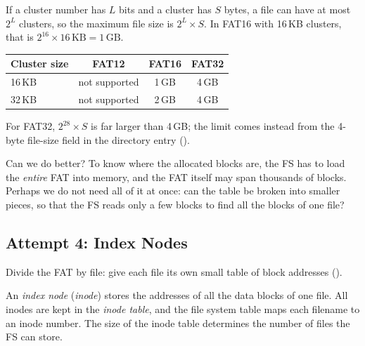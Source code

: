 \begin{keypoint}
  If a cluster number has $L$ bits and a cluster has $S$ bytes, a file can have at most $2^L$ clusters, so the maximum file size is $2^L \times S$. In FAT16 with 16\,KB clusters, that is $2^{16} \times 16\,\text{KB} = 1\,\text{GB}$.
  \begin{center}
  \begin{tabular}{lccc}
    \toprule
    Cluster size & FAT12 & FAT16 & FAT32 \\
    \midrule
    16\,KB & not supported & 1\,GB & 4\,GB \\
    32\,KB & not supported & 2\,GB & 4\,GB \\
    \bottomrule
  \end{tabular}
  \end{center}
  For FAT32, $2^{28} \times S$ is far larger than 4\,GB; the limit comes instead from the 4-byte file-size field in the directory entry ().
\end{keypoint}

Can we do better? To know where the allocated blocks are, the FS has to load the \emph{entire} FAT into memory, and the FAT itself may span thousands of blocks. Perhaps we do not need all of it at once: can the table be broken into smaller pieces, so that the FS reads only a few blocks to find all the blocks of one file?

\subsection{Attempt 4: Index Nodes}

Divide the FAT by file: give each file its own small table of block addresses ().

\begin{definition}
  An \emph{index node} (\emph{inode}) stores the addresses of all the data blocks of one file. All inodes are kept in the \emph{inode table}, and the file system table maps each filename to an inode number. The size of the inode table determines the number of files the FS can store.
\end{definition}

